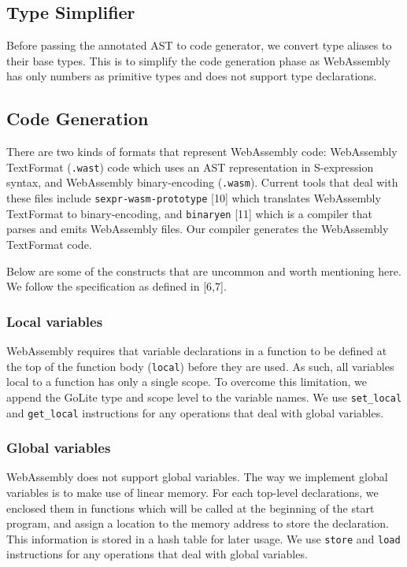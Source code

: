 \documentclass{article}
\begin{document}
\subsection{Type Simplifier}
Before passing the annotated AST to code generator, we convert type aliases to their base types. This is to simplify the code generation phase as WebAssembly has only numbers as primitive types and does not support type declarations.

\subsection{Code Generation}
There are two kinds of formats that represent WebAssembly code: WebAssembly TextFormat (\verb|.wast|) code which uses an AST representation in S-expression syntax, and WebAssembly binary-encoding (\verb|.wasm|). Current tools that deal with these files include \verb|sexpr-wasm-prototype| [10] which translates WebAssembly TextFormat to binary-encoding, and \verb|binaryen| [11] which is a compiler that parses and emits WebAssembly files. Our compiler generates the WebAssembly TextFormat code.

Below are some of the constructs that are uncommon and worth mentioning here. We follow the specification as defined in [6,7].

\subsubsection{Local variables}
WebAssembly requires that variable declarations in a function to be defined at the top of the function body (\verb|local|) before they are used. As such, all variables local to a function has only a single scope. To overcome this limitation, we append the GoLite type and scope level to the variable names. We use \verb|set_local| and \verb|get_local| instructions for any operations that deal with global variables.

\subsubsection{Global variables}
WebAssembly does not support global variables. The way we implement global variables is to make use of linear memory. For each top-level declarations, we enclosed them in functions which will be called at the beginning of the start program, and assign a location to the memory address to store the declaration. This information is stored in a hash table for later usage. We use \verb|store| and \verb|load| instructions for any operations that deal with global variables.
\end{document}
